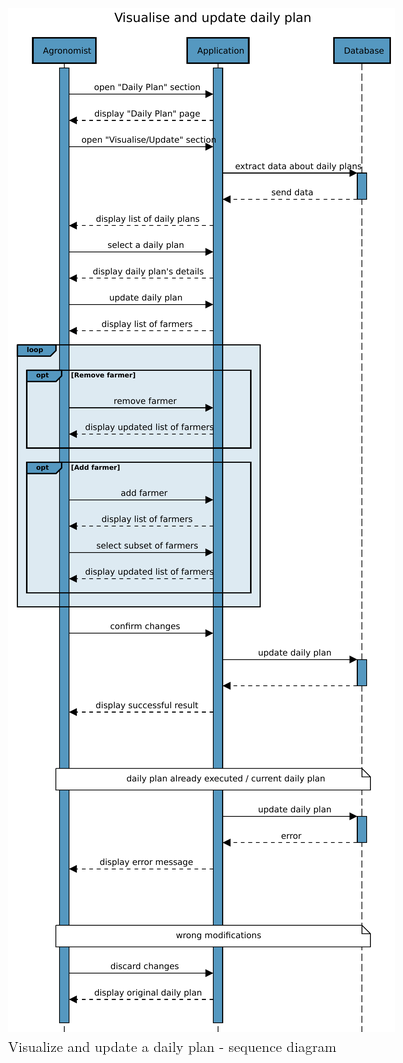 \begin{figure}[H]
    \centering
    \includegraphics[scale=0.5]{Images/Sequence diagrams/Agronomist - visualise and update daily plan.pdf}

    \caption{Visualize and update a daily plan - sequence diagram}
    \label{fig:fig:seq_diag_update_daily_plan}
\end{figure}


